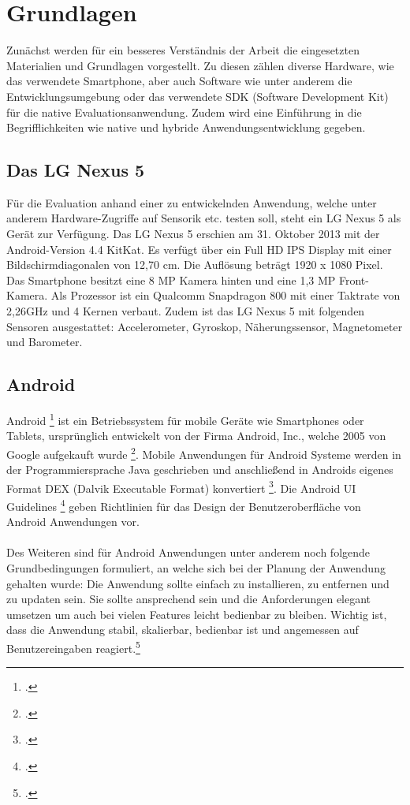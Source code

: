 \chapter{Grundlagen}

Zunächst werden für ein besseres Verständnis der Arbeit die eingesetzten Materialien und Grundlagen vorgestellt. Zu diesen zählen diverse Hardware, wie das verwendete Smartphone, aber auch Software wie unter anderem die Entwicklungsumgebung oder das verwendete SDK (Software Development Kit) für die native Evaluationsanwendung. Zudem wird eine Einführung in die Begrifflichkeiten wie native und hybride Anwendungsentwicklung gegeben.

\section{Das LG Nexus 5}

Für die Evaluation anhand einer zu entwickelnden Anwendung, welche unter anderem Hardware-Zugriffe auf Sensorik etc. testen soll, steht ein LG Nexus 5 als Gerät zur Verfügung. Das LG Nexus 5 erschien am 31. Oktober 2013 mit der Android-Version 4.4 KitKat. Es verfügt über ein Full HD IPS Display mit einer Bildschirmdiagonalen von 12,70 cm. Die Auflösung beträgt 1920 x 1080 Pixel. Das Smartphone besitzt eine 8 MP Kamera hinten und eine 1,3 MP Front-Kamera. Als Prozessor ist ein Qualcomm Snapdragon 800 mit einer Taktrate von 2,26GHz und 4 Kernen verbaut. Zudem ist das LG Nexus 5 mit folgenden Sensoren ausgestattet: Accelerometer, Gyroskop, Näherungssensor, Magnetometer und Barometer. 

\section{Android}

Android \footcite{Android} ist ein Betriebssystem für mobile Geräte wie Smartphones oder Tablets, ursprünglich entwickelt von der Firma Android, Inc., welche 2005 von Google aufgekauft wurde \footcite{AndroidHistory}. Mobile Anwendungen für Android Systeme werden in der Programmiersprache Java geschrieben und anschließend in Androids eigenes Format DEX (Dalvik Executable Format) konvertiert \footcite{AndroidCookbook}. Die Android UI Guidelines \footcite{AndroidGuidelines} geben Richtlinien für das Design der Benutzeroberfläche von Android Anwendungen vor.
\\
\\
Des Weiteren sind für Android Anwendungen unter anderem noch folgende Grundbedingungen formuliert, an welche sich bei der Planung der Anwendung gehalten wurde: Die Anwendung sollte einfach zu installieren, zu entfernen und zu updaten sein. Sie sollte ansprechend sein und die Anforderungen elegant umsetzen um auch bei vielen Features leicht bedienbar zu bleiben. Wichtig ist, dass die Anwendung stabil, skalierbar, bedienbar ist und angemessen auf Benutzereingaben reagiert.\footcite{AndroidCookbook}

